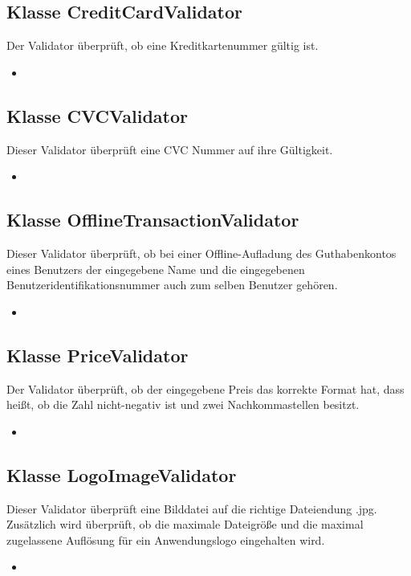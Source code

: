 \documentclass[a4paper]{scrreprt}
\begin{document}
    \subsection{Klasse CreditCardValidator}
    Der Validator überprüft, ob eine Kreditkartenummer gültig ist.
    \begin{itemize}
    	\item \override
    \end{itemize}
    
    \subsection{Klasse CVCValidator}
    Dieser Validator überprüft eine CVC Nummer auf ihre Gültigkeit.
    \begin{itemize}
        \item \override
    \end{itemize}
    
    \subsection{Klasse OfflineTransactionValidator}
    Dieser Validator überprüft, ob bei einer Offline-Aufladung des Guthabenkontos eines Benutzers der eingegebene Name und die eingegebenen Benutzeridentifikationsnummer auch zum selben Benutzer gehören.
    \begin{itemize}
    	\item \override
    \end{itemize}
    
    \subsection{Klasse PriceValidator}
    Der Validator überprüft, ob der eingegebene Preis das korrekte Format hat, dass heißt, ob die Zahl nicht-negativ ist und zwei Nachkommastellen besitzt.
    \begin{itemize}
     	\item \override
    \end{itemize}
	
	\subsection{Klasse LogoImageValidator}
	Dieser Validator überprüft eine Bilddatei auf die richtige Dateiendung .jpg. Zusätzlich wird überprüft, ob
	die maximale Dateigröße und die maximal zugelassene Auflösung für ein Anwendungslogo eingehalten wird.
	\begin{itemize}
		\item \override
	\end{itemize}
	
\end{document}

